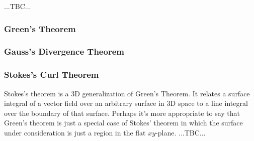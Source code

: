 ...TBC...




\subsubsection{Green's Theorem}

\subsubsection{Gauss's Divergence Theorem}

\subsubsection{Stokes's Curl Theorem}
Stokes's theorem is a 3D generalization of Green's Theorem. It relates a surface integral of a vector field over an arbitrary surface in 3D space to a line integral over the boundary of that surface. Perhaps it's more appropriate to say that Green's theorem is just a special case of Stokes' theorem in which the surface under consideration is just a region in the flat $xy$-plane. ...TBC...







\begin{comment}

-make a section for how to compute potentials for a given evctor field
-before that, have a section for how to test, if a potential even exists 

-i'm not sure, if path integrals and surface integrals should be treated here or in the "General Concepts" section ...maybe here - there, we only do integrals of scalar fields


https://en.wikipedia.org/wiki/Matrix_calculus


\end{comment}

